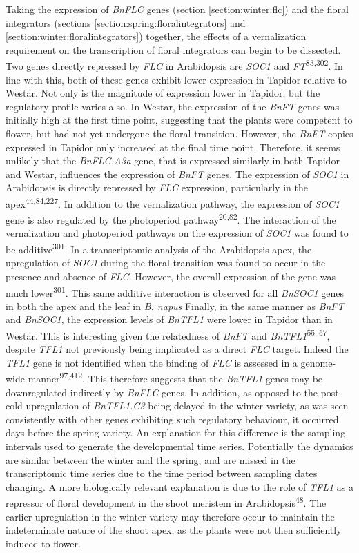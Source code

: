 \documentclass[12pt,]{book}
\begin{document}
Taking the expression of \emph{BnFLC} genes (section
\ref{section:winter:flc}) and the floral integrators (sections
\ref{section:spring:floralintegrators} and
\ref{section:winter:floralintegrators}) together, the effects of a
vernalization requirement on the transcription of floral integrators can
begin to be dissected. Two genes directly repressed by \emph{FLC} in
Arabidopsis are \emph{SOC1} and \emph{FT}\textsuperscript{83,302}. In
line with this, both of these genes exhibit lower expression in Tapidor
relative to Westar. Not only is the magnitude of expression lower in
Tapidor, but the regulatory profile varies also. In Westar, the
expression of the \emph{BnFT} genes was initially high at the first time
point, suggesting that the plants were competent to flower, but had not
yet undergone the floral transition. However, the \emph{BnFT} copies
expressed in Tapidor only increased at the final time point. Therefore,
it seems unlikely that the \emph{BnFLC.A3a} gene, that is expressed
similarly in both Tapidor and Westar, influences the expression of
\emph{BnFT} genes. The expression of \emph{SOC1} in Arabidopsis is
directly repressed by \emph{FLC} expression, particularly in the
apex\textsuperscript{44,84,227}. In addition to the vernalization
pathway, the expression of \emph{SOC1} gene is also regulated by the
photoperiod pathway\textsuperscript{20,82}. The interaction of the
vernalization and photoperiod pathways on the expression of \emph{SOC1}
was found to be additive\textsuperscript{301}. In a transcriptomic
analysis of the Arabidopsis apex, the upregulation of \emph{SOC1} during
the floral transition was found to occur in the presence and absence of
\emph{FLC}. However, the overall expression of the gene was much
lower\textsuperscript{301}. This same additive interaction is observed
for all \emph{BnSOC1} genes in both the apex and the leaf in \emph{B.
napus} Finally, in the same manner as \emph{BnFT} and \emph{BnSOC1}, the
expression levels of \emph{BnTFL1} were lower in Tapidor than in Westar.
This is interesting given the relatedness of \emph{BnFT} and
\emph{BnTFL1}\textsuperscript{55--57}, despite \emph{TFL1} not
previously being implicated as a direct \emph{FLC} target. Indeed the
\emph{TFL1} gene is not identified when the binding of \emph{FLC} is
assessed in a genome-wide manner\textsuperscript{97,412}. This therefore
suggests that the \emph{BnTFL1} genes may be downregulated indirectly by
\emph{BnFLC} genes. In addition, as opposed to the post-cold
upregulation of \emph{BnTFL1.C3} being delayed in the winter variety, as
was seen consistently with other genes exhibiting such regulatory
behaviour, it occurred days before the spring variety. An explanation
for this difference is the sampling intervals used to generate the
developmental time series. Potentially the dynamics are similar between
the winter and the spring, and are missed in the transcriptomic time
series due to the time period between sampling dates changing. A more
biologically relevant explanation is due to the role of \emph{TFL1} as a
repressor of floral development in the shoot meristem in
Arabidopsis\textsuperscript{48}. The earlier upregulation in the winter
variety may therefore occur to maintain the indeterminate nature of the
shoot apex, as the plants were not then sufficiently induced to flower.
\end{document}
